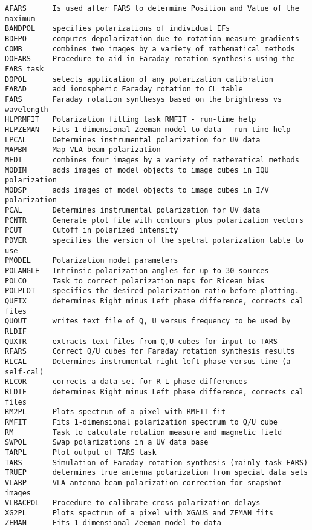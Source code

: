 \vskip 0.5pt
\bbve\begin{verbatim}
AFARS      Is used after FARS to determine Position and Value of the maximum
BANDPOL    specifies polarizations of individual IFs
BDEPO      computes depolarization due to rotation measure gradients
COMB       combines two images by a variety of mathematical methods
DOFARS     Procedure to aid in Faraday rotation synthesis using the FARS task
DOPOL      selects application of any polarization calibration
FARAD      add ionospheric Faraday rotation to CL table
FARS       Faraday rotation synthesys based on the brightness vs wavelength
HLPRMFIT   Polarization fitting task RMFIT - run-time help
HLPZEMAN   Fits 1-dimensional Zeeman model to data - run-time help
LPCAL      Determines instrumental polarization for UV data
MAPBM      Map VLA beam polarization
MEDI       combines four images by a variety of mathematical methods
MODIM      adds images of model objects to image cubes in IQU polarization
MODSP      adds images of model objects to image cubes in I/V polarization
PCAL       Determines instrumental polarization for UV data
PCNTR      Generate plot file with contours plus polarization vectors
PCUT       Cutoff in polarized intensity
PDVER      specifies the version of the spetral polarization table to use
PMODEL     Polarization model parameters
POLANGLE   Intrinsic polarization angles for up to 30 sources
POLCO      Task to correct polarization maps for Ricean bias
POLPLOT    specifies the desired polarization ratio before plotting.
QUFIX      determines Right minus Left phase difference, corrects cal files
QUOUT      writes text file of Q, U versus frequency to be used by RLDIF
QUXTR      extracts text files from Q,U cubes for input to TARS
RFARS      Correct Q/U cubes for Faraday rotation synthesis results
RLCAL      Determines instrumental right-left phase versus time (a self-cal)
RLCOR      corrects a data set for R-L phase differences
RLDIF      determines Right minus Left phase difference, corrects cal files
RM2PL      Plots spectrum of a pixel with RMFIT fit
RMFIT      Fits 1-dimensional polarization spectrum to Q/U cube
RM         Task to calculate rotation measure and magnetic field
SWPOL      Swap polarizations in a UV data base
TARPL      Plot output of TARS task
TARS       Simulation of Faraday rotation synthesis (mainly task FARS)
TRUEP      determines true antenna polarization from special data sets
VLABP      VLA antenna beam polarization correction for snapshot images
VLBACPOL   Procedure to calibrate cross-polarization delays
XG2PL      Plots spectrum of a pixel with XGAUS and ZEMAN fits
ZEMAN      Fits 1-dimensional Zeeman model to data
\end{verbatim}\eve

